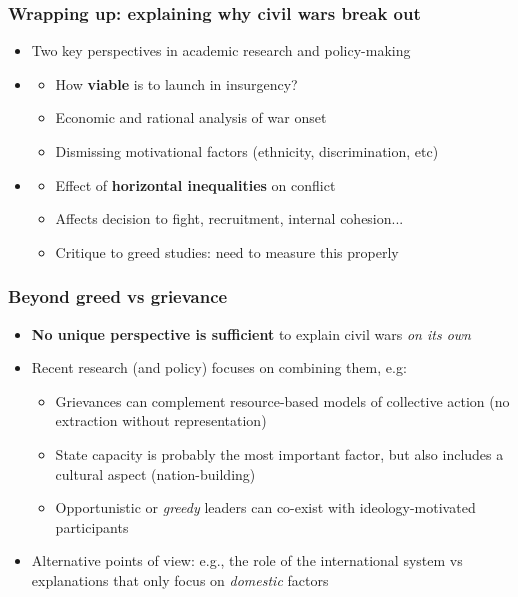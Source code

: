 \documentclass[aspectratio=43]{beamer}
\begin{document}
\begin{frame}
\frametitle{Wrapping up: explaining why civil wars break out}
\centering

\begin{itemize}
  \item<1-> Two key perspectives in academic research and policy-making
  \item<2-> 
    \begin{itemize}
      \item How \textbf{viable} is to launch in insurgency?
      \item Economic and rational analysis of war onset
      \item Dismissing motivational factors (ethnicity, discrimination, etc)
    \end{itemize}
  \item<3-> 
  \begin{itemize}
    \item Effect of \textbf{horizontal inequalities} on conflict
    \item Affects decision to fight, recruitment, internal cohesion...
    \item Critique to greed studies: need to measure this properly
  \end{itemize}
\end{itemize}

\end{frame}

\begin{frame}
\frametitle{Beyond greed vs grievance}
\centering

\begin{itemize}
  \item \textbf{No unique perspective is sufficient} to explain civil wars \textit{on its own}
  \item Recent research (and policy) focuses on combining them, e.g:
  \begin{itemize}
    \item<2-> Grievances can complement resource-based models of collective action (no extraction without representation)
    \item<3-> State capacity is probably the most important factor, but also includes a cultural aspect (nation-building)
    \item<4-> Opportunistic or \textit{greedy} leaders can co-exist with ideology-motivated participants
  \end{itemize}
  \item<5-> Alternative points of view: e.g., the role of the international system vs explanations that only focus on \textit{domestic} factors
\end{itemize}

\end{frame}
\end{document}
